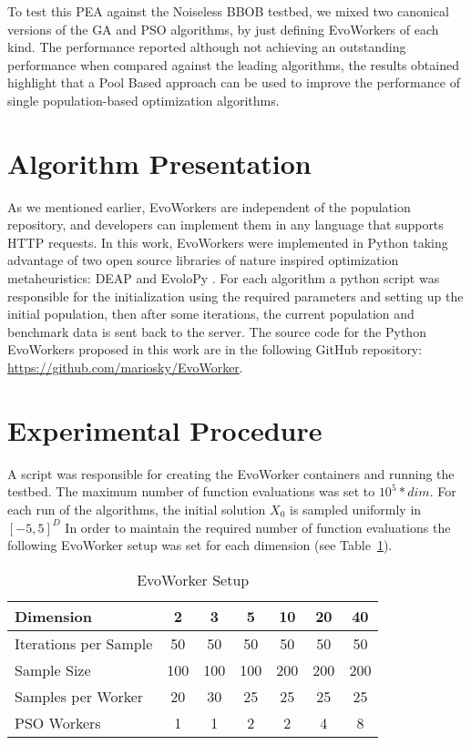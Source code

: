 \documentclass[sigconf]{acmart}
\begin{document}
To test this PEA against the Noiseless BBOB testbed, 
we mixed two canonical versions of the GA and PSO algorithms, 
by just defining EvoWorkers of each kind. The performance reported 
although not achieving an outstanding performance when compared 
against the leading algorithms, the results obtained highlight 
that a Pool Based approach can be used to improve the performance 
of single population-based optimization algorithms.

\section{Algorithm Presentation}

As we mentioned earlier, EvoWorkers are independent of 
the population repository, and developers can implement them 
in any language that supports HTTP requests. In this work,  
EvoWorkers were implemented in Python taking advantage of 
two open source libraries of nature inspired optimization 
metaheuristics:  DEAP \cite{fortin2012deap} and EvoloPy 
\cite{faris2016evolopy}. For each algorithm a 
python script was responsible for the initialization using 
the required parameters and setting up the initial population, 
then after some iterations, the current population and 
benchmark data is sent back to the server. The source code 
for the Python EvoWorkers proposed in this work are in 
the following GitHub repository: \url{https://github.com/mariosky/EvoWorker}.


%
\section{Experimental Procedure}
A script was responsible for creating the EvoWorker 
containers and running the testbed. The maximum number of 
function evaluations was set to $10^5*dim$. For each run 
of the algorithms, the initial solution
$X_0$ is sampled uniformly in $[−5, 5]^D$
In order to maintain the required number of function 
evaluations the following EvoWorker setup was set for
each dimension (see Table~\ref{tab:params}).

\begin{table}
  \small
  \caption{EvoWorker Setup}
  \label{tab:params} 
  \centering
  \small
  \begin{tabular}{|l|c|c|c|c|c|c|}
    \hline
    Dimension & 2 & 3 & 5 & 10 & 20 & 40\\ \hline
    Iterations per Sample  & 50 & 50 & 50 & 50 & 50 & 50\\ \hline
    Sample Size  & 100 & 100 & 100 & 200 & 200 & 200 \\ \hline
    Samples per Worker & 20 & 30 & 25 & 25 & 25 & 25  \\ \hline
    PSO Workers & 1 & 1 & 2 & 2 & 4 & 8  \\ \hline
  \end{tabular}
\end{table}
\end{document}
